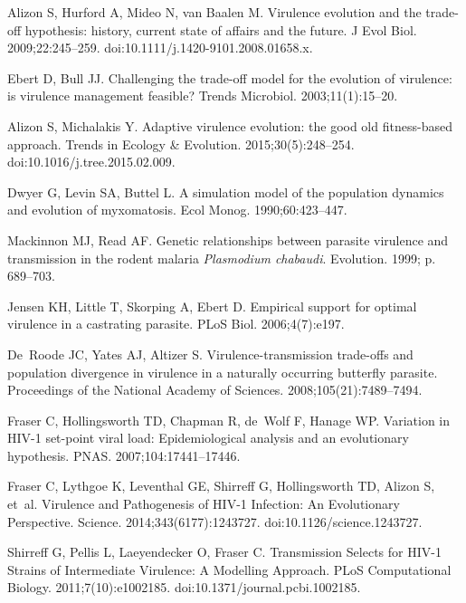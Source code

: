 \documentclass[10pt,letterpaper]{article}
\begin{document}
\begin{thebibliography}{10}

Alizon S, Hurford A, Mideo N, van Baalen M.
\newblock Virulence evolution and the trade-off hypothesis: history, current
  state of affairs and the future.
\newblock J Evol Biol. 2009;22:245--259.
\newblock doi:{10.1111/j.1420-9101.2008.01658.x}.

Ebert D, Bull JJ.
\newblock Challenging the trade-off model for the evolution of virulence: is
  virulence management feasible?
\newblock Trends Microbiol. 2003;11(1):15--20.

Alizon S, Michalakis Y.
\newblock Adaptive virulence evolution: the good old fitness-based approach.
\newblock Trends in Ecology \& Evolution. 2015;30(5):248--254.
\newblock doi:{10.1016/j.tree.2015.02.009}.

Dwyer G, Levin SA, Buttel L.
\newblock A simulation model of the population dynamics and evolution of
  myxomatosis.
\newblock Ecol Monog. 1990;60:423--447.

Mackinnon MJ, Read AF.
\newblock Genetic relationships between parasite virulence and transmission in
  the rodent malaria {{\em Plasmodium chabaudi}}.
\newblock Evolution. 1999; p. 689--703.

Jensen KH, Little T, Skorping A, Ebert D.
\newblock Empirical support for optimal virulence in a castrating parasite.
\newblock PLoS Biol. 2006;4(7):e197.

De~Roode JC, Yates AJ, Altizer S.
\newblock Virulence-transmission trade-offs and population divergence in
  virulence in a naturally occurring butterfly parasite.
\newblock Proceedings of the National Academy of Sciences.
  2008;105(21):7489--7494.

Fraser C, Hollingsworth TD, Chapman R, de~Wolf F, Hanage WP.
\newblock Variation in {HIV}-1 set-point viral load: Epidemiological analysis
  and an evolutionary hypothesis.
\newblock PNAS. 2007;104:17441--17446.

Fraser C, Lythgoe K, Leventhal GE, Shirreff G, Hollingsworth TD, Alizon S,
  et~al.
\newblock Virulence and Pathogenesis of {HIV}-1 Infection: An Evolutionary
  Perspective.
\newblock Science. 2014;343(6177):1243727.
\newblock doi:{10.1126/science.1243727}.

Shirreff G, Pellis L, Laeyendecker O, Fraser C.
\newblock Transmission Selects for {HIV-1} Strains of Intermediate Virulence: A
  Modelling Approach.
\newblock PLoS Computational Biology. 2011;7(10):e1002185.
\newblock doi:{10.1371/journal.pcbi.1002185}.


\end{thebibliography}
\end{document}
